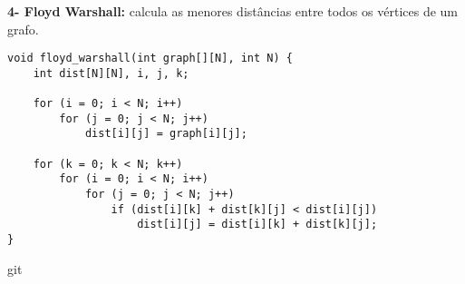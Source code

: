 \textbf{4- Floyd Warshall:} calcula as menores distâncias entre todos os vértices de um grafo.
    \begin{verbatim}
void floyd_warshall(int graph[][N], int N) {
    int dist[N][N], i, j, k;

    for (i = 0; i < N; i++)
        for (j = 0; j < N; j++)
            dist[i][j] = graph[i][j];

    for (k = 0; k < N; k++) 
        for (i = 0; i < N; i++) 
            for (j = 0; j < N; j++) 
                if (dist[i][k] + dist[k][j] < dist[i][j])
                    dist[i][j] = dist[i][k] + dist[k][j];
}
    \end{verbatim}
\pagebreak

git 